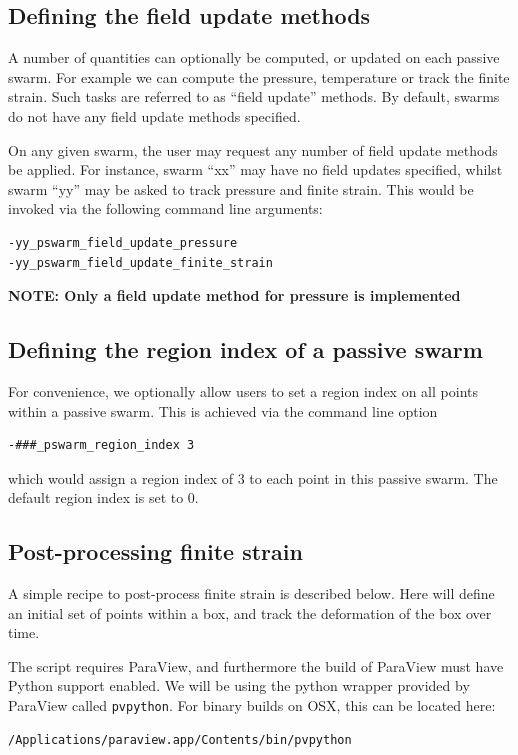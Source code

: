 \documentclass[paper=a4, fontsize=10pt,twoside]{scrartcl}
\begin{document}
{{\subsection{Defining the field update methods}

A number of quantities can optionally be computed, or updated on each passive swarm.
For example we can compute the pressure, temperature or track the finite strain.
Such tasks are referred to as ``field update'' methods. By default, swarms do not have
any field update methods specified.

On any given swarm, the user may request any number of field update methods be applied.
For instance, swarm ``xx'' may have no field updates specified, whilst swarm ``yy'' may be
asked to track pressure and finite strain. This would be invoked via the following command
line arguments:
\begin{lstlisting}
-yy_pswarm_field_update_pressure
-yy_pswarm_field_update_finite_strain
\end{lstlisting}

\textbf{NOTE: Only a field update method for pressure is implemented}

\subsection{Defining the region index of a passive swarm}

For convenience, we optionally allow users to set a region index on all points within a passive swarm.
This is achieved via the command line option
\begin{lstlisting}
-###_pswarm_region_index 3
\end{lstlisting}
which would assign a region index of 3 to each point in this passive swarm.
The default region index is set to 0.

\subsection{Post-processing finite strain}
A simple recipe to post-process finite strain is described below.
Here will define an initial set of points within a box, and track the deformation of the box over time.

The script requires ParaView, and furthermore the build of ParaView must have Python support enabled.
We will be using the python wrapper provided by ParaView called {\tt pvpython}.
For binary builds on OSX, this can be located here:
\begin{lstlisting}
/Applications/paraview.app/Contents/bin/pvpython
\end{lstlisting}

}}
\end{document}
